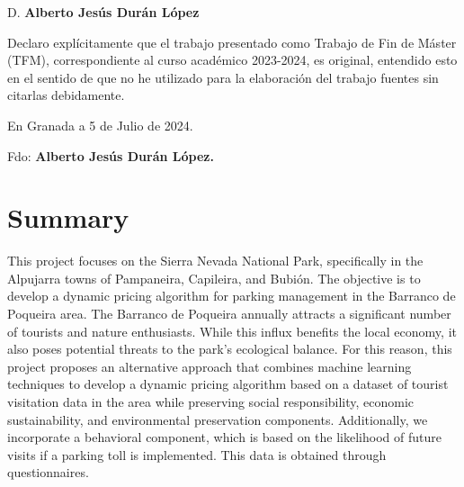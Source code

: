 \documentclass[12pt]{book}
\begin{document}
\noindent D. \textbf{Alberto Jesús Durán López} \\\medskip

\noindent Declaro explícitamente que el trabajo presentado como Trabajo de Fin de Máster (TFM), correspondiente al curso académico 2023-2024, es original, entendido esto en el sentido de que no he utilizado para la elaboración del trabajo fuentes sin citarlas debidamente.
\medskip

\noindent En Granada a 5 de Julio de 2024.
\vspace{3cm}

\begin{center}
    Fdo: \textbf{Alberto Jesús Durán López.}
\end{center}

\vfill

\newpage
\thispagestyle{empty}
\mbox{}
\newpage




\tableofcontents





\chapter*{Summary}


This project focuses on the Sierra Nevada National Park, specifically in the Alpujarra towns of Pampaneira, Capileira, and Bubión. The objective is to develop a dynamic pricing algorithm for parking management in the Barranco de Poqueira area. The Barranco de Poqueira annually attracts a significant number of tourists and nature enthusiasts. While this influx benefits the local economy, it also poses potential threats to the park's ecological balance. For this reason, this project proposes an alternative approach that combines machine learning techniques to develop a dynamic pricing algorithm based on a dataset of tourist visitation data in the area while preserving social responsibility, economic sustainability, and environmental preservation components. Additionally, we incorporate a behavioral component, which is based on the likelihood of future visits if a parking toll is implemented. This data is obtained through questionnaires.
\end{document}
